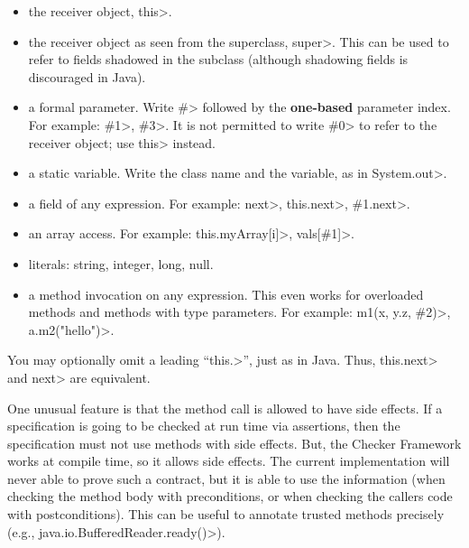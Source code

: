 \begin{itemize}
\item
  the receiver object, \<this>.
\item
  the receiver object as seen from the superclass, \<super>.  This can be used
  to refer to fields shadowed in the subclass (although shadowing fields is
  discouraged in Java).
\item
  a formal parameter.  Write \<\#> followed by the \textbf{one-based} parameter
  index.  For example: \<\#1>, \<\#3>.  It is not permitted to write \<\#0> to
  refer to the receiver object; use \<this> instead.

\item
  a static variable.  Write the class name and the variable, as in
  \<System.out>.

\item
  a field of any expression.  For example:  \<next>,
  \<this.next>, \<\#1.next>. %

\item
  an array access.  For example:  \<this.myArray[i]>, \<vals[\#1]>.

\item literals: string, integer, long, null.

\item a method invocation on any expression.
  This even works for overloaded methods and methods with type parameters.
  For example:
  \<m1(x, y.z, \#2)>, \<a.m2("hello")>.

\end{itemize}

You may optionally omit a leading ``\<this.>'', just as in Java.  Thus,
\<this.next> and \<next> are equivalent.

One unusual feature is that the method call is allowed to have side
effects.  If a specification is going to be checked at run time via
assertions, then the specification must not use methods with side
effects.  But, the Checker Framework works at compile time, so it allows
side effects.
The current implementation will never able to prove such
a contract, but it is able to use the information (when checking
the method body with preconditions, or when checking the callers
code with postconditions).  This can be useful to annotate trusted
methods precisely (e.g., \<java.io.BufferedReader.ready()>).

